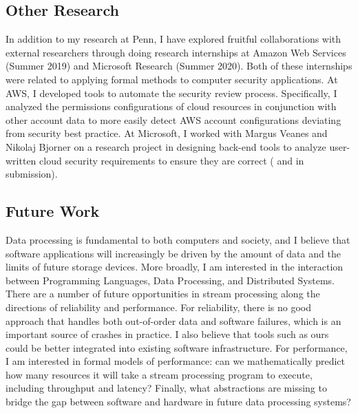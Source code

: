 \documentclass{article}
\begin{document}
\subsection*{Other Research}

In addition to my research at Penn, I have explored fruitful collaborations
with external researchers through doing research internships at Amazon Web Services (Summer 2019) and Microsoft Research (Summer 2020).
Both of these internships were related to applying formal methods to computer security applications.
At AWS, I developed tools to automate the security review process. Specifically, I analyzed the permissions configurations of cloud resources in conjunction with other account data to more easily detect AWS account configurations deviating from security best practice.
At Microsoft, I worked with Margus Veanes and Nikolaj Bjorner
on a research project in designing back-end tools to analyze
user-written cloud security requirements to ensure they are correct (\cite{pldi21} and in submission).

\subsection*{Future Work}

Data processing is fundamental to both computers and society, and I believe that software applications will increasingly be driven by
the amount of data and the limits of future storage devices.
More broadly, I am interested in the interaction between Programming Languages, Data Processing, and Distributed Systems.
There are a number of future opportunities in stream processing along the directions of reliability and performance.
For reliability,
there is no good approach that handles both out-of-order data and software failures, which is an important source of crashes in practice.
I also believe that tools such as ours could be better integrated into existing software infrastructure.
For performance,
I am interested in formal models of performance: can we mathematically predict how many resources it will take a stream processing program to execute,
including throughput and latency?
Finally, what abstractions are missing to bridge the gap between software and hardware in future data processing systems?



\end{document}
